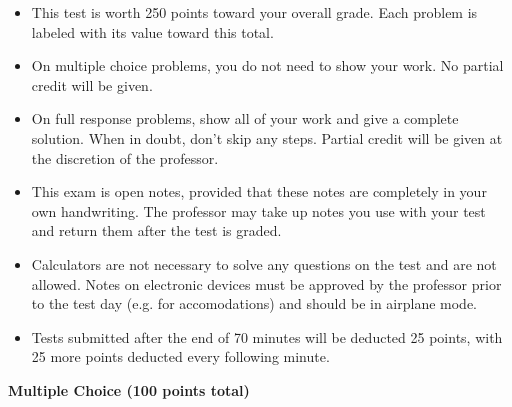 \documentclass[12pt]{exam}
\newcommand{\<}{\langle}
\renewcommand{\>}{\rangle}
\begin{document}
\begin{center}
\end{center}
\vspace{0.1in}

\vspace{12pt}

\begin{itemize}
  \item This test is worth 250 points toward your overall grade.
        Each problem is labeled with its value toward this total. %
  \item On multiple choice problems, you do not need to show your work. No
        partial credit will be given.
  \item On full response problems, show all of your work and give a
        complete solution. When in doubt, don't skip any steps. Partial
        credit will be given at the discretion of the professor.
  \item This exam is open notes, provided that these notes are completely
        in your own handwriting. The professor may take up notes you use
        with your test and return them after the test is graded.
  \item Calculators are not necessary to solve any questions on the test and
        are not allowed.
        Notes on electronic devices must be approved by the professor
        prior to the test day (e.g. for accomodations) and should be in
        airplane mode.
  \item Tests submitted after the end of 70 minutes will be deducted 25 points,
        with 25 more points deducted every following minute.
\end{itemize}

\newpage

\begin{center}
  \textbf{Multiple Choice (100 points total)}
\end{center}
\end{document}
